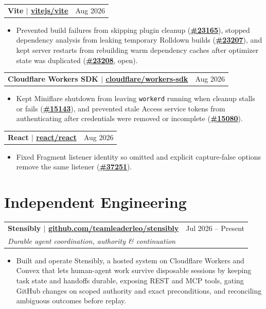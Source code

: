 \documentclass[letterpaper,11pt]{article}
\makeatletter
\newcommand{\resumeHeading}[4]{%
  \begin{tabularx}{\textwidth}{@{}Xr@{}}
    \textbf{#1} & #2 \\
    \textit{\small #3} & \textit{\small #4}
  \end{tabularx}\vspace{-2pt}
}
\newcommand{\resumeHeadingSimple}[2]{%
  \begin{tabularx}{\textwidth}{@{}Xr@{}}
    \textbf{#1} & #2
  \end{tabularx}\vspace{-0.25pt}
}
\newcommand{\resumeItemListStart}{\begin{itemize}[leftmargin=0.23in,itemsep=0.8pt,parsep=0pt,topsep=0.6pt]}
\newcommand{\resumeItem}[1]{\item\fontsize{10.2pt}{11.7pt}\selectfont #1}
\newcommand{\resumeItemListEnd}{\end{itemize}\vspace{-0.25pt}}
\makeatother
\begin{document}
\resumeHeadingSimple
  {Vite $|$ \href{https://redirect.github.com/vitejs/vite}{vitejs/vite}}
  {Aug 2026}
\resumeItemListStart
  \resumeItem{Prevented build failures from skipping plugin cleanup (\href{https://redirect.github.com/vitejs/vite/pull/23165}{\textbf{\#23165}}), stopped dependency analysis from leaking temporary Rolldown builds (\href{https://redirect.github.com/vitejs/vite/pull/23207}{\textbf{\#23207}}), and kept server restarts from rebuilding warm dependency caches after optimizer state was duplicated (\href{https://redirect.github.com/vitejs/vite/pull/23208}{\textbf{\#23208}}, open).}
\resumeItemListEnd

\resumeHeadingSimple
  {Cloudflare Workers SDK $|$ \href{https://redirect.github.com/cloudflare/workers-sdk}{cloudflare/workers-sdk}}
  {Aug 2026}
\resumeItemListStart
  \resumeItem{Kept Miniflare shutdown from leaving \texttt{workerd} running when cleanup stalls or fails (\href{https://redirect.github.com/cloudflare/workers-sdk/pull/15143}{\textbf{\#15143}}), and prevented stale Access service tokens from authenticating after credentials were removed or incomplete (\href{https://redirect.github.com/cloudflare/workers-sdk/pull/15080}{\textbf{\#15080}}).}
\resumeItemListEnd

\resumeHeadingSimple
  {React $|$ \href{https://redirect.github.com/react/react}{react/react}}
  {Aug 2026}
\resumeItemListStart
  \resumeItem{Fixed Fragment listener identity so omitted and explicit capture-false options remove the same listener (\href{https://redirect.github.com/react/react/pull/37251}{\textbf{\#37251}}).}
\resumeItemListEnd

\section{Independent Engineering}


\resumeHeading
  {Stensibly $|$ \href{https://github.com/teamleaderleo/stensibly}{github.com/teamleaderleo/stensibly}}
  {Jul 2026 -- Present}
  {\normalfont Durable agent coordination, authority \& continuation}
  {}
\resumeItemListStart
  \resumeItem{Built and operate Stensibly, a hosted system on Cloudflare Workers and Convex that lets human-agent work survive disposable sessions by keeping task state and handoffs durable, exposing REST and MCP tools, gating GitHub changes on scoped authority and exact preconditions, and reconciling ambiguous outcomes before replay.}
\resumeItemListEnd
\end{document}

